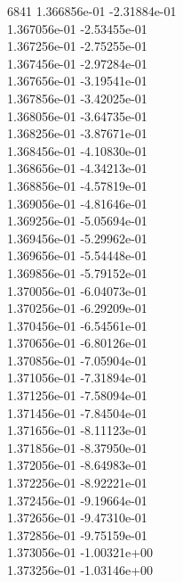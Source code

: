 6841	1.366856e-01	-2.31884e-01	\\ 	1.367056e-01	-2.53455e-01	\\ 	1.367256e-01	-2.75255e-01	\\ 	1.367456e-01	-2.97284e-01	\\ 	1.367656e-01	-3.19541e-01	\\ 	1.367856e-01	-3.42025e-01	\\ 	1.368056e-01	-3.64735e-01	\\ 	1.368256e-01	-3.87671e-01	\\ 	1.368456e-01	-4.10830e-01	\\ 	1.368656e-01	-4.34213e-01	\\ 	1.368856e-01	-4.57819e-01	\\ 	1.369056e-01	-4.81646e-01	\\ 	1.369256e-01	-5.05694e-01	\\ 	1.369456e-01	-5.29962e-01	\\ 	1.369656e-01	-5.54448e-01	\\ 	1.369856e-01	-5.79152e-01	\\ 	1.370056e-01	-6.04073e-01	\\ 	1.370256e-01	-6.29209e-01	\\ 	1.370456e-01	-6.54561e-01	\\ 	1.370656e-01	-6.80126e-01	\\ 	1.370856e-01	-7.05904e-01	\\ 	1.371056e-01	-7.31894e-01	\\ 	1.371256e-01	-7.58094e-01	\\ 	1.371456e-01	-7.84504e-01	\\ 	1.371656e-01	-8.11123e-01	\\ 	1.371856e-01	-8.37950e-01	\\ 	1.372056e-01	-8.64983e-01	\\ 	1.372256e-01	-8.92221e-01	\\ 	1.372456e-01	-9.19664e-01	\\ 	1.372656e-01	-9.47310e-01	\\ 	1.372856e-01	-9.75159e-01	\\ 	1.373056e-01	-1.00321e+00	\\ 	1.373256e-01	-1.03146e+00	\\ \hline
